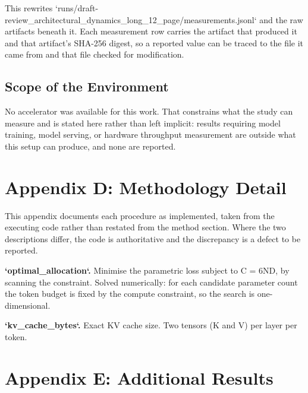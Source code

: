 \documentclass[10pt,journal,compsoc,twocolumn]{IEEEtran}
\begin{document}
This rewrites `runs/draft-review\_architectural\_dynamics\_long\_12\_page/measurements.jsonl` and the raw artifacts beneath it. Each measurement row carries the artifact that produced it and that artifact's SHA-256 digest, so a reported value can be traced to the file it came from and that file checked for modification.


\subsection{Scope of the Environment}


No accelerator was available for this work. That constrains what the study can measure and is stated here rather than left implicit: results requiring model training, model serving, or hardware throughput measurement are outside what this setup can produce, and none are reported.




\section{Appendix D: Methodology Detail}


This appendix documents each procedure as implemented, taken from the executing code rather than restated from the method section. Where the two descriptions differ, the code is authoritative and the discrepancy is a defect to be reported.

\textbf{`optimal\_allocation`.} Minimise the parametric loss subject to C = 6ND, by scanning the constraint. Solved numerically: for each candidate parameter count the token budget is fixed by the compute constraint, so the search is one-dimensional.

\textbf{`kv\_cache\_bytes`.} Exact KV cache size. Two tensors (K and V) per layer per token.




\section{Appendix E: Additional Results}
\end{document}

